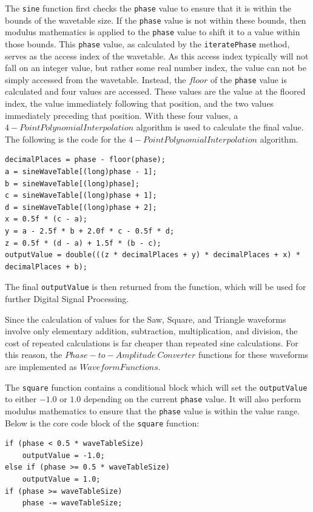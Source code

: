 \documentclass[a4paper,12pt]{report}
\begin{document}
The \texttt{sine} function first checks the \texttt{phase} value to ensure that it is within the bounds of the wavetable size. If the \texttt{phase} value is not within these bounds, then modulus mathematics is applied to the \texttt{phase} value to shift it to a value within those bounds. This \texttt{phase} value, as calculated by the \texttt{iteratePhase} method, serves as the access index of the wavetable. As this access index typically will not fall on an integer value, but rather some real number index, the value can not be simply accessed from the wavetable. Instead, the $floor$ of the \texttt{phase} value is calculated and four values are accessed. These values are the value at the floored index, the value immediately following that position, and the two values immediately preceding that position. With these four values, a $4-Point Polynomial Interpolation$ algorithm is used to calculate the final value. The following is the code for the $4-Point Polynomial Interpolation$ algorithm.
\begin{lstlisting}[caption={4-Point Polynomial Interpolation implementation},label={code:4ptpolyinterpolation},captionpos=b]
decimalPlaces = phase - floor(phase);
a = sineWaveTable[(long)phase - 1];
b = sineWaveTable[(long)phase];
c = sineWaveTable[(long)phase + 1];
d = sineWaveTable[(long)phase + 2];
x = 0.5f * (c - a);
y = a - 2.5f * b + 2.0f * c - 0.5f * d;
z = 0.5f * (d - a) + 1.5f * (b - c);
outputValue = double(((z * decimalPlaces + y) * decimalPlaces + x) * decimalPlaces + b);
\end{lstlisting}
The final \texttt{outputValue} is then returned from the function, which will be used for further Digital Signal Processing.

Since the calculation of values for the Saw, Square, and Triangle waveforms involve only elementary addition, subtraction, multiplication, and division, the cost of repeated calculations is far cheaper than repeated sine calculations. For this reason, the $Phase-to-Amplitude\ Converter$ functions for these waveforms are implemented as $Waveform Functions$.

The \texttt{square} function contains a conditional block which will set the \texttt{outputValue} to either $-1.0$ or $1.0$ depending on the current \texttt{phase} value. It will also perform modulus mathematics to ensure that the \texttt{phase} value is within the value range. Below is the core code block of the \texttt{square} function:
\begin{lstlisting}[caption={square()},label={code:square},captionpos=b]
if (phase < 0.5 * waveTableSize)
    outputValue = -1.0;
else if (phase >= 0.5 * waveTableSize)
    outputValue = 1.0;
if (phase >= waveTableSize)
    phase -= waveTableSize;
\end{lstlisting}
\end{document}
